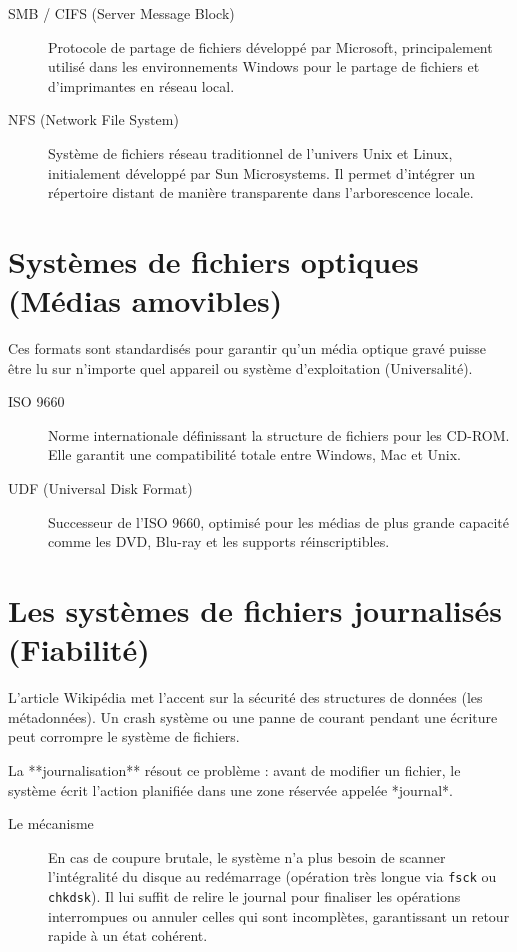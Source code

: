 \begin{description}
    \item[SMB / CIFS (Server Message Block)] Protocole de partage de fichiers développé par Microsoft, principalement utilisé dans les environnements Windows pour le partage de fichiers et d'imprimantes en réseau local.
    \item[NFS (Network File System)] Système de fichiers réseau traditionnel de l'univers Unix et Linux, initialement développé par Sun Microsystems. Il permet d'intégrer un répertoire distant de manière transparente dans l'arborescence locale.
\end{description}


\section{Systèmes de fichiers optiques (Médias amovibles)}
Ces formats sont standardisés pour garantir qu'un média optique gravé puisse être lu sur n'importe quel appareil ou système d'exploitation (Universalité).

\begin{description}
    \item[ISO 9660] Norme internationale définissant la structure de fichiers pour les CD-ROM. Elle garantit une compatibilité totale entre Windows, Mac et Unix.
    \item[UDF (Universal Disk Format)] Successeur de l'ISO 9660, optimisé pour les médias de plus grande capacité comme les DVD, Blu-ray et les supports réinscriptibles.
\end{description}


\section{Les systèmes de fichiers journalisés (Fiabilité)}
L'article Wikipédia met l'accent sur la sécurité des structures de données (les métadonnées). Un crash système ou une panne de courant pendant une écriture peut corrompre le système de fichiers.

La **journalisation** résout ce problème : avant de modifier un fichier, le système écrit l'action planifiée dans une zone réservée appelée *journal*.

\begin{description}
    \item[Le mécanisme] En cas de coupure brutale, le système n'a plus besoin de scanner l'intégralité du disque au redémarrage (opération très longue via \texttt{fsck} ou \texttt{chkdsk}). Il lui suffit de relire le journal pour finaliser les opérations interrompues ou annuler celles qui sont incomplètes, garantissant un retour rapide à un état cohérent.
\end{description}

